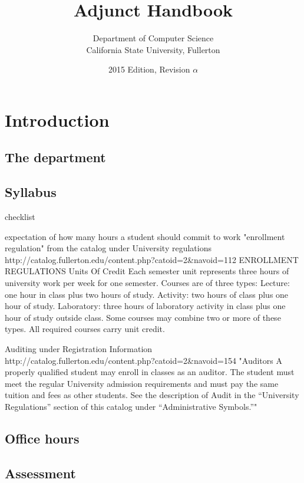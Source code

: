 \documentclass{book}
\begin{document}
\title{Adjunct Handbook}
\author{Department of Computer Science \\ California State University, Fullerton}
\date{2015 Edition, Revision $\alpha$}
\maketitle

\newpage
\tableofcontents

\chapter{Introduction}

\section{The department}

\section{Syllabus}
checklist

expectation of how many hours a student should commit to work
"enrollment regulation" from the catalog under University regulations
http://catalog.fullerton.edu/content.php?catoid=2&navoid=112
ENROLLMENT REGULATIONS
Units Of Credit
Each semester unit represents three hours of university work per week for one semester. Courses are of three types:
Lecture: one hour in class plus two hours of study.
Activity: two hours of class plus one hour of study.
Laboratory: three hours of laboratory activity in class plus one hour of study outside class.
Some courses may combine two or more of these types. All required courses carry unit credit.

Auditing
under Registration Information
http://catalog.fullerton.edu/content.php?catoid=2&navoid=154
"Auditors
A properly qualified student may enroll in classes as an auditor. The student must meet the regular University admission requirements and must pay the same tuition and fees as other students. See the description of Audit in the “University Regulations” section of this catalog under “Administrative Symbols.”"
\section{Office hours}
\section{Assessment}
\end{document}
